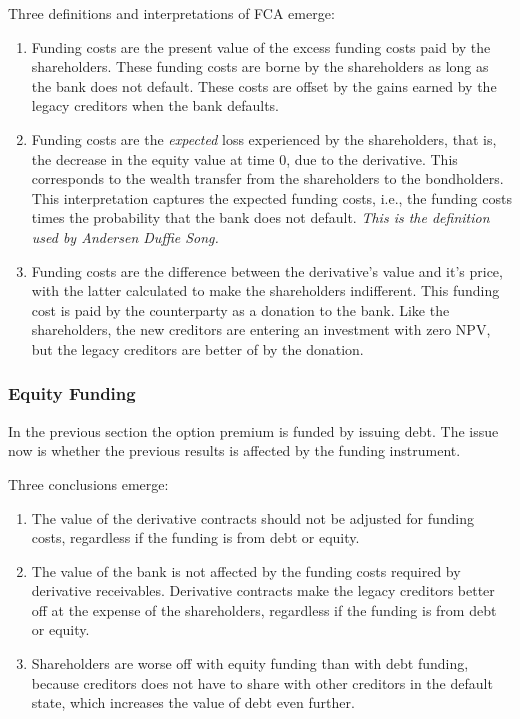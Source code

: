 \documentclass[10pt,a4paper]{article}
\begin{document}
                Three definitions and interpretations of FCA emerge:
                    \begin{enumerate}
                        \item Funding costs are the present value of the excess funding costs paid by the shareholders. These funding costs are borne by the shareholders as long as the bank does not default. These costs are offset by the gains earned by the legacy creditors when the bank defaults. 
                        \item Funding costs are the \textit{expected} loss experienced by the shareholders, that is, the decrease in the equity value at time 0, due to the derivative. This corresponds to the wealth transfer from the shareholders to the bondholders. This interpretation captures the expected funding costs, i.e., the funding costs times the probability that the bank does not default. \textit{This is the definition used by Andersen Duffie Song.}
                        \item Funding costs are the difference between the derivative's value and it's price, with the latter calculated to make the shareholders indifferent. This funding cost is paid by the counterparty as a donation to the bank. Like the shareholders, the new creditors are entering an investment with zero NPV, but the legacy creditors are better of by the donation. 
                    \end{enumerate}

            \subsubsection{Equity Funding}
                In the previous section the option premium is funded by issuing debt. The issue now is whether the previous results is affected by the funding instrument.

                Three conclusions emerge:
                    \begin{enumerate}
                        \item The value of the derivative contracts should not be adjusted for funding costs, regardless if the funding is from debt or equity.
                        \item The value of the bank is not affected by the funding costs required by derivative receivables. Derivative contracts make the legacy creditors better off at the expense of the shareholders, regardless if the funding is from debt or equity.
                        \item Shareholders are worse off with equity funding than with debt funding, because creditors does not have to share with other creditors in the default state, which increases the value of debt even further.
                    \end{enumerate}
\end{document}

